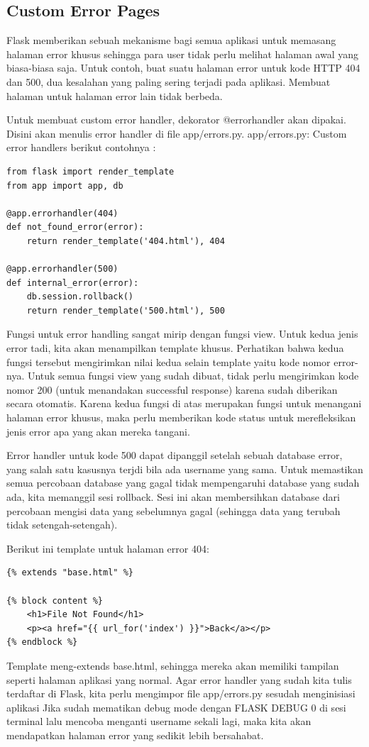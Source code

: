 \subsection{Custom Error Pages}
Flask memberikan sebuah mekanisme bagi semua aplikasi untuk memasang halaman error khusus sehingga para user tidak perlu melihat halaman awal yang biasa-biasa saja. Untuk contoh, buat suatu halaman error untuk kode HTTP 404 dan 500, dua kesalahan yang paling sering terjadi pada aplikasi. Membuat halaman untuk halaman error lain tidak berbeda.

Untuk membuat custom error handler, dekorator @errorhandler akan dipakai. Disini akan menulis error handler di file app/errors.py.
app/errors.py: Custom error handlers berikut contohnya :
\begin{verbatim}
from flask import render_template
from app import app, db

@app.errorhandler(404)
def not_found_error(error):
    return render_template('404.html'), 404

@app.errorhandler(500)
def internal_error(error):
    db.session.rollback()
    return render_template('500.html'), 500
 \end{verbatim}
 
Fungsi untuk error handling sangat mirip dengan fungsi view. Untuk kedua jenis error tadi, kita akan menampilkan template khusus. Perhatikan bahwa kedua fungsi tersebut mengirimkan nilai kedua selain template yaitu kode nomor error-nya. Untuk semua fungsi view yang sudah dibuat, tidak perlu mengirimkan kode nomor 200 (untuk menandakan successful response) karena sudah diberikan secara otomatis.
Karena kedua fungsi di atas merupakan fungsi untuk menangani halaman error khusus, maka  perlu memberikan kode status untuk merefleksikan jenis error apa yang akan mereka tangani.

Error handler untuk kode 500 dapat dipanggil setelah sebuah database error, yang salah satu kasusnya terjdi bila ada username yang sama. Untuk memastikan semua percobaan database yang gagal tidak mempengaruhi database yang sudah ada, kita memanggil sesi rollback. Sesi ini akan membersihkan database dari percobaan mengisi data yang sebelumnya gagal (sehingga data yang terubah tidak setengah-setengah).

Berikut ini template untuk halaman error 404:
\begin{verbatim}
{% extends "base.html" %}

{% block content %}
    <h1>File Not Found</h1>
    <p><a href="{{ url_for('index') }}">Back</a></p>
{% endblock %}
 \end{verbatim}
Template meng-extends base.html, sehingga mereka akan memiliki tampilan seperti halaman aplikasi yang normal. 
Agar error handler yang sudah kita tulis terdaftar di Flask, kita perlu mengimpor file app/errors.py sesudah menginisiasi aplikasi
Jika sudah mematikan debug mode dengan FLASK DEBUG 0 di sesi terminal lalu mencoba menganti username sekali lagi, maka kita akan mendapatkan halaman error yang sedikit lebih bersahabat.


